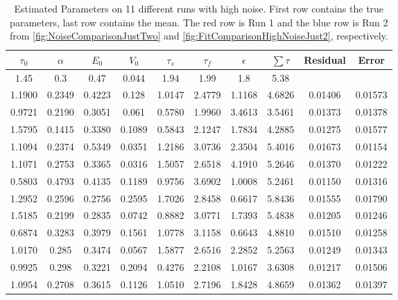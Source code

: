 \begin{table}[t]
\centering
\begin{tabular}{|c | c | c | c | c | c | c | c | c | c |}
\hline 
$\tau_0$ & $\alpha$ & $E_0$    & $V_0$    & $\tau_s$ & $\tau_f$ & $\epsilon$  & $ \sum \tau $ & Residual  & Error\\
\hline 
\rowcolor[gray]{.8}
1.45 & 0.3 & 0.47 & 0.044 & 1.94 & 1.99 & 1.8  & 5.38 &  & \\
\hline 
\hline 
1.1900 & 0.2349 & 0.4223 & 0.128  & 1.0147 & 2.4779 & 1.1168 & 4.6826 &0.01406 &0.01573   \\
0.9721 & 0.2190 & 0.3051 & 0.061  & 0.5780 & 1.9960 & 3.4613 & 3.5461 &0.01373 &0.01378   \\
1.5795 & 0.1415 & 0.3380 & 0.1089 & 0.5843 & 2.1247 & 1.7834 & 4.2885 &0.01275 &0.01577   \\
1.1094 & 0.2374 & 0.5349 & 0.0351 & 1.2186 & 3.0736 & 2.3504 & 5.4016 &0.01673 &0.01154    \\
1.1071 & 0.2753 & 0.3365 & 0.0316 & 1.5057 & 2.6518 & 4.1910 & 5.2646 &0.01370 &0.01222   \\
0.5803 & 0.4793 & 0.4135 & 0.1189 & 0.9756 & 3.6902 & 1.0008 & 5.2461 &0.01150 &0.01316   \\
\rowcolor[rgb]{.9,.5,.5}
1.2952 & 0.2596 & 0.2756 & 0.2595 & 1.7026 & 2.8458 & 0.6617 & 5.8436 &0.01555 &0.01790   \\
\rowcolor[rgb]{.5,.5,.9}
1.5185 & 0.2199 & 0.2835 & 0.0742 & 0.8882 & 3.0771 & 1.7393 & 5.4838 &0.01205 &0.01246   \\
0.6874 & 0.3283 & 0.3979 & 0.1561 & 1.0778 & 3.1158 & 0.6643 & 4.8810 &0.01510 &0.01258   \\
1.0170 & 0.285  & 0.3474 & 0.0567 & 1.5877 & 2.6516 & 2.2852 & 5.2563 &0.01249 &0.01343   \\
0.9925 & 0.298  & 0.3221 & 0.2094 & 0.4276 & 2.2108 & 1.0167 & 3.6308 &0.01217 &0.01506   \\
\hline                                                                          
1.0954 & 0.2708 & 0.3615 & 0.1126 & 1.0510 & 2.7196 & 1.8428 & 4.8659 &0.01362 &0.01397\\
\hline 
\end{tabular}
\caption{Estimated Parameters on 11 different runs with high noise. First row contains the true parameters,
last row contains the mean.
The red row is Run 1 and the blue row is Run 2 from  \autoref{fig:NoiseComparisonJustTwo}
and \autoref{fig:FitComparisonHighNoiseJust2}, respectively.}
\label{tab:HighNoiseResults} 
\end{table}


